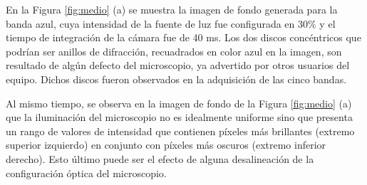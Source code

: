 En la Figura \ref{fig:medio} (a) se muestra la imagen de fondo generada para la banda azul, cuya intensidad de la fuente de luz fue configurada en 30$\%$ y el tiempo de integración de la cámara fue de 40 ms. Los dos discos concéntricos que podrían ser anillos de difracción, recuadrados en color azul en la imagen, son resultado de algún defecto del microscopio, ya advertido por otros usuarios del equipo. Dichos discos fueron observados en la adquisición de las cinco bandas.

Al mismo tiempo, se observa en la imagen de fondo de la Figura \ref{fig:medio} (a) que la iluminación del microscopio no es idealmente uniforme sino que presenta un rango de valores de intensidad que contienen píxeles más brillantes (extremo superior izquierdo) en conjunto con píxeles más oscuros (extremo inferior derecho). Esto último puede ser el efecto de alguna desalineación de la configuración óptica del microscopio.
 
